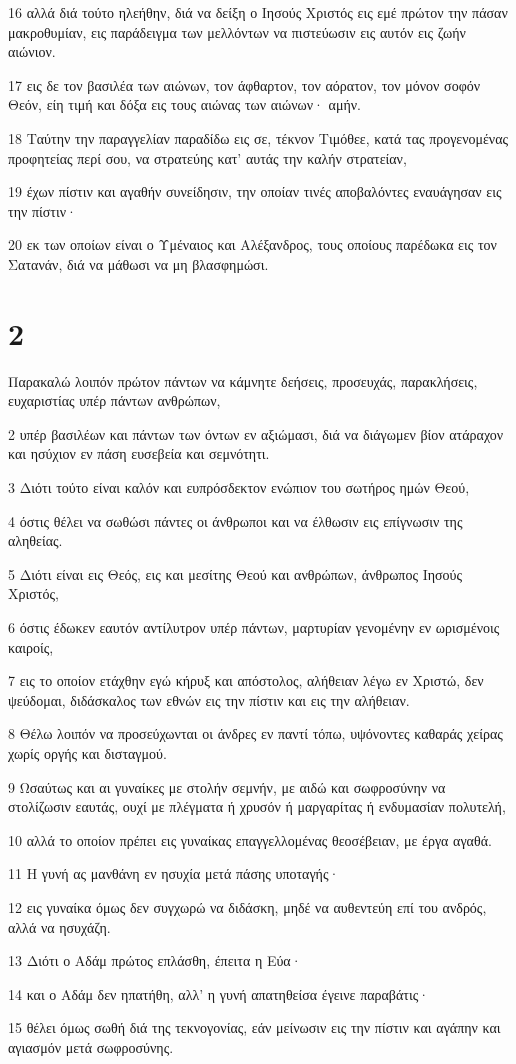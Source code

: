 \par 16 αλλά διά τούτο ηλεήθην, διά να δείξη ο Ιησούς Χριστός εις εμέ πρώτον την πάσαν μακροθυμίαν, εις παράδειγμα των μελλόντων να πιστεύωσιν εις αυτόν εις ζωήν αιώνιον.
\par 17 εις δε τον βασιλέα των αιώνων, τον άφθαρτον, τον αόρατον, τον μόνον σοφόν Θεόν, είη τιμή και δόξα εις τους αιώνας των αιώνων· αμήν.
\par 18 Ταύτην την παραγγελίαν παραδίδω εις σε, τέκνον Τιμόθεε, κατά τας προγενομένας προφητείας περί σου, να στρατεύης κατ' αυτάς την καλήν στρατείαν,
\par 19 έχων πίστιν και αγαθήν συνείδησιν, την οποίαν τινές αποβαλόντες εναυάγησαν εις την πίστιν·
\par 20 εκ των οποίων είναι ο Υμέναιος και Αλέξανδρος, τους οποίους παρέδωκα εις τον Σατανάν, διά να μάθωσι να μη βλασφημώσι.

\chapter{2}

\par Παρακαλώ λοιπόν πρώτον πάντων να κάμνητε δεήσεις, προσευχάς, παρακλήσεις, ευχαριστίας υπέρ πάντων ανθρώπων,
\par 2 υπέρ βασιλέων και πάντων των όντων εν αξιώμασι, διά να διάγωμεν βίον ατάραχον και ησύχιον εν πάση ευσεβεία και σεμνότητι.
\par 3 Διότι τούτο είναι καλόν και ευπρόσδεκτον ενώπιον του σωτήρος ημών Θεού,
\par 4 όστις θέλει να σωθώσι πάντες οι άνθρωποι και να έλθωσιν εις επίγνωσιν της αληθείας.
\par 5 Διότι είναι εις Θεός, εις και μεσίτης Θεού και ανθρώπων, άνθρωπος Ιησούς Χριστός,
\par 6 όστις έδωκεν εαυτόν αντίλυτρον υπέρ πάντων, μαρτυρίαν γενομένην εν ωρισμένοις καιροίς,
\par 7 εις το οποίον ετάχθην εγώ κήρυξ και απόστολος, αλήθειαν λέγω εν Χριστώ, δεν ψεύδομαι, διδάσκαλος των εθνών εις την πίστιν και εις την αλήθειαν.
\par 8 Θέλω λοιπόν να προσεύχωνται οι άνδρες εν παντί τόπω, υψόνοντες καθαράς χείρας χωρίς οργής και δισταγμού.
\par 9 Ωσαύτως και αι γυναίκες με στολήν σεμνήν, με αιδώ και σωφροσύνην να στολίζωσιν εαυτάς, ουχί με πλέγματα ή χρυσόν ή μαργαρίτας ή ενδυμασίαν πολυτελή,
\par 10 αλλά το οποίον πρέπει εις γυναίκας επαγγελλομένας θεοσέβειαν, με έργα αγαθά.
\par 11 Η γυνή ας μανθάνη εν ησυχία μετά πάσης υποταγής·
\par 12 εις γυναίκα όμως δεν συγχωρώ να διδάσκη, μηδέ να αυθεντεύη επί του ανδρός, αλλά να ησυχάζη.
\par 13 Διότι ο Αδάμ πρώτος επλάσθη, έπειτα η Εύα·
\par 14 και ο Αδάμ δεν ηπατήθη, αλλ' η γυνή απατηθείσα έγεινε παραβάτις·
\par 15 θέλει όμως σωθή διά της τεκνογονίας, εάν μείνωσιν εις την πίστιν και αγάπην και αγιασμόν μετά σωφροσύνης.

